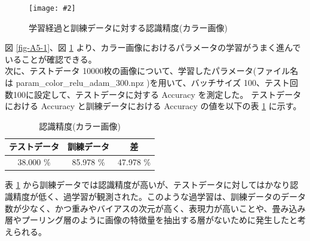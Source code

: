\documentclass[a4paper,dvipdfmx]{jsarticle}
\newcommand{\image}[3]{
    \begin{figure}[H]
        \begin{center}
        \texttt{[image: \#2]}
        \end{center}
        \caption{#1}
        \label{#3}
    \end{figure}
}
\begin{document}
\image{学習経過と訓練データに対する認識精度(カラー画像)}{report_a5-2.png}{fig-A5-2}

図 \ref{fig-A5-1}、図 \ref{fig-A5-2} より、カラー画像におけるパラメータの学習がうまく進んでいることが確認できる。\\

次に、テストデータ 10000枚の画像について、学習したパラメータ(ファイル名は param\_color\_relu\_adam\_300.npz )を用いて、バッチサイズ 100、テスト回数100に設定して、テストデータに対する Accuracy を測定した。
テストデータにおける Accuracy と訓練データにおける Accuracy の値を以下の表 \ref{tableA5-1} に示す。
\begin{table}[H]
\begin{center}
\caption{認識精度(カラー画像)}
  \begin{tabular}{|c|c|c|} \hline
    テストデータ & 訓練データ & 差 \\ \hline \hline
    38.000 \% & 85.978 \% & 47.978 \%\\ \hline
  \end{tabular}
	\label{tableA5-1}
\end{center}
\end{table}

表 \ref{tableA5-1} から訓練データでは認識精度が高いが、テストデータに対してはかなり認識精度が低く、過学習が観測された。このような過学習は、訓練データのデータ数が少なく、かつ重みやバイアスの次元が高く、表現力が高いことや、畳み込み層やプーリング層のように画像の特徴量を抽出する層がないために発生したと考えられる。 
\end{document}
